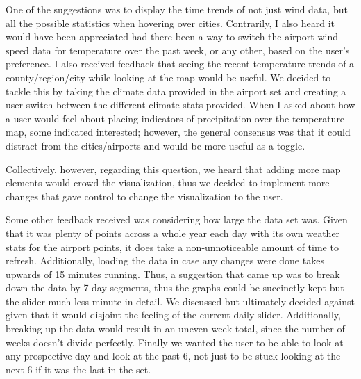 \documentclass[9pt,twocolumn,twoside]{opticajnl}
\begin{document}
One of the suggestions was to display the time trends of not just wind data, but all the possible statistics when hovering over cities. Contrarily, I also heard it would have been appreciated had there been a way to switch the airport wind speed data for temperature over the past week, or any other, based on the user's preference. I also received feedback that seeing the recent temperature trends of a county/region/city while looking at the map would be useful. We decided to tackle this by taking the climate data provided in the airport set and creating a user switch between the different climate stats provided. When I asked about how a user would feel about placing indicators of precipitation over the temperature map, some indicated interested; however, the general consensus was that it could distract from the cities/airports and would be more useful as a toggle.

Collectively, however, regarding this question, we heard that adding more map elements would crowd the visualization, thus we decided to implement more changes that gave control to change the visualization to the user.

Some other feedback received was considering how large the data set was. Given that it was plenty of points across a whole year each day with its own weather stats for the airport points, it does take a non-unnoticeable amount of time to refresh. Additionally, loading the data in case any changes were done takes upwards of 15 minutes running. Thus, a suggestion that came up was to break down the data by 7 day segments, thus the graphs could be succinctly kept but the slider much less minute in detail. We discussed but ultimately decided against given that it would disjoint the feeling of the current daily slider. Additionally, breaking up the data would result in an uneven week total, since the number of weeks doesn't divide perfectly. Finally we wanted the user to be able to look at any prospective day and look at the past 6, not just to be stuck looking at the next 6 if it was the last in the set.
\end{document}
